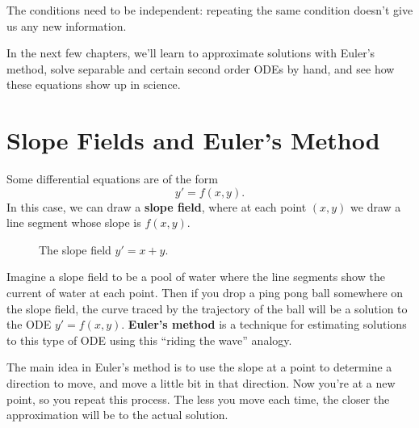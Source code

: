 The conditions need to be independent: repeating the same condition
doesn't give us any new information.

In the next few chapters, we'll learn to approximate solutions with
Euler's method, solve separable and certain second order ODEs by hand,
and see how these equations show up in science.


\clearpage
\section{Slope Fields and Euler's Method}

Some differential equations are of the form 
$$y'=f(x,y).$$
In this case, we can draw a \textbf{slope field}, where at each point $(x,y)$ we draw a line segment whose slope is $f(x,y)$. 

\begin{figure}[H]
\centering

\caption{The slope field $y'=x+y$.}
\end{figure}


Imagine a slope field to be a pool of water where the line segments show the current of water at each point. Then if you drop a ping pong ball somewhere on the slope field, the curve traced by the trajectory of the ball will be a solution to the ODE $y'=f(x,y)$. \textbf{Euler's method} is a technique for estimating solutions to this type of ODE using this ``riding the wave'' analogy.


The main idea in Euler's method is to use the slope at a point to determine a direction to move, and move a little bit in that direction. Now you're at a new point, so you repeat this process. The less you move each time, the closer the approximation will be to the actual solution.

